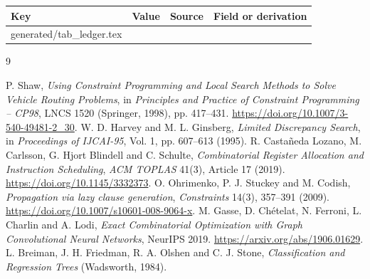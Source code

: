 \documentclass[11pt,a4paper]{article}
\makeatletter
\newcommand{\tableinput}[1]{\@@input #1 }
\makeatother
\begin{document}
{\scriptsize
\begin{longtable}{>{\raggedright\arraybackslash}p{32mm}>{\raggedright\arraybackslash}p{24mm}>{\raggedright\arraybackslash}p{53mm}>{\raggedright\arraybackslash}p{38mm}}
\toprule
Key & Value & Source & Field or derivation\\\midrule\endhead
\tableinput{generated/tab_ledger.tex}
\bottomrule
\end{longtable}}

\begin{thebibliography}{9}\raggedright\small
{} P. Shaw, \emph{Using Constraint Programming and Local Search
Methods to Solve Vehicle Routing Problems}, in \emph{Principles and Practice of
Constraint Programming -- CP98}, LNCS 1520 (Springer, 1998), pp. 417--431.
\url{https://doi.org/10.1007/3-540-49481-2_30}.
 W. D. Harvey and M. L. Ginsberg, \emph{Limited Discrepancy
Search}, in \emph{Proceedings of IJCAI-95}, Vol. 1, pp. 607--613 (1995).
 R. Castañeda Lozano, M. Carlsson, G. Hjort Blindell and
C. Schulte, \emph{Combinatorial Register Allocation and Instruction Scheduling},
\emph{ACM TOPLAS} 41(3), Article 17 (2019). \url{https://doi.org/10.1145/3332373}.
 O. Ohrimenko, P. J. Stuckey and M. Codish,
\emph{Propagation via lazy clause generation}, \emph{Constraints} 14(3),
357--391 (2009). \url{https://doi.org/10.1007/s10601-008-9064-x}.
 M. Gasse, D. Chételat, N. Ferroni, L. Charlin and A. Lodi,
\emph{Exact Combinatorial Optimization with Graph Convolutional Neural Networks},
NeurIPS 2019. \url{https://arxiv.org/abs/1906.01629}.
 L. Breiman, J. H. Friedman, R. A. Olshen and C. J. Stone,
\emph{Classification and Regression Trees} (Wadsworth, 1984).
\end{thebibliography}
\end{document}
